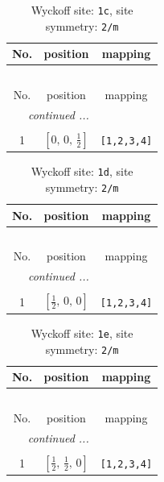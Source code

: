 \documentclass[fleqn,8pt]{jsarticle}
\begin{document}
\begin{longtable}{ccc}
\caption{Wyckoff site: {\tt 1c}, site symmetry: {\tt 2/m}}
 \\
 \hline \hline
No. & position & mapping \\ \hline \endfirsthead

\multicolumn{2}{l}{\tablename\ \thetable{}} \\
 \hline \hline
No. & position & mapping \\ \hline \endhead

 \hline \hline
\multicolumn{2}{r}{\footnotesize\it continued ...} \\ \endfoot

 \hline \hline
\multicolumn{2}{r}{} \\ \endlastfoot

1 & $\left[ 0,\, 0,\, \frac{1}{2} \right]$ & {\tt [1,2,3,4]} \\
\end{longtable}
\renewcommand{\arraystretch}{1.2}
\begin{longtable}{ccc}
\caption{Wyckoff site: {\tt 1d}, site symmetry: {\tt 2/m}}
 \\
 \hline \hline
No. & position & mapping \\ \hline \endfirsthead

\multicolumn{2}{l}{\tablename\ \thetable{}} \\
 \hline \hline
No. & position & mapping \\ \hline \endhead

 \hline \hline
\multicolumn{2}{r}{\footnotesize\it continued ...} \\ \endfoot

 \hline \hline
\multicolumn{2}{r}{} \\ \endlastfoot

1 & $\left[ \frac{1}{2},\, 0,\, 0 \right]$ & {\tt [1,2,3,4]} \\
\end{longtable}
\renewcommand{\arraystretch}{1.2}
\begin{longtable}{ccc}
\caption{Wyckoff site: {\tt 1e}, site symmetry: {\tt 2/m}}
 \\
 \hline \hline
No. & position & mapping \\ \hline \endfirsthead

\multicolumn{2}{l}{\tablename\ \thetable{}} \\
 \hline \hline
No. & position & mapping \\ \hline \endhead

 \hline \hline
\multicolumn{2}{r}{\footnotesize\it continued ...} \\ \endfoot

 \hline \hline
\multicolumn{2}{r}{} \\ \endlastfoot

1 & $\left[ \frac{1}{2},\, \frac{1}{2},\, 0 \right]$ & {\tt [1,2,3,4]} \\
\end{longtable}
\end{document}
